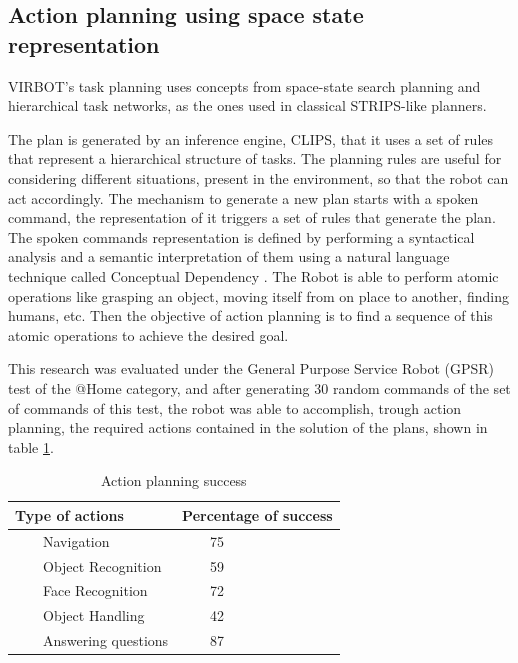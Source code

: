 \documentclass{llncs}
\begin{document}
\subsection{Action planning using space state representation}\label{subsec:ActionPln}
VIRBOT's task planning uses concepts from space-state search planning and hierarchical task networks,
as the ones used in classical STRIPS-like planners.

The plan is generated by an inference engine, CLIPS, that it uses a set of rules that represent a hierarchical structure of tasks.
The planning rules are useful for considering different situations, present in the environment, so that the robot can act accordingly.
The mechanism to generate a new plan starts with a spoken command, the representation of it  triggers a set of rules that generate the plan.
The spoken commands representation is defined by performing a syntactical analysis and a semantic interpretation of them using a 
natural language technique called Conceptual Dependency \cite{Schank}.
The Robot is able to perform atomic operations like grasping an object, moving itself
from on place to another, finding humans, etc. Then the objective of action planning is to
find a sequence of this atomic operations to achieve the desired goal.

This research was evaluated under the General Purpose Service Robot (GPSR) test of the @Home category, and after generating 30
random commands of the set of commands of this test, the robot was able to accomplish, trough action planning, the required actions
contained in the solution of the plans, shown in table \ref{tab:action_planning}.  

\begin{table}
\centering
\begin{tabular}{|l|l|}
\hline
Type of actions & Percentage of success\\
\hline
$\qquad$Navigation & $\qquad$75\\
$\qquad$Object Recognition & $\qquad$59\\
$\qquad$Face Recognition & $\qquad$72\\
$\qquad$Object Handling & $\qquad$42\\
$\qquad$Answering questions & $\qquad$87\\
\hline
\end{tabular}
\caption{Action planning success}
\label{tab:action_planning}
\end{table}
\end{document}
